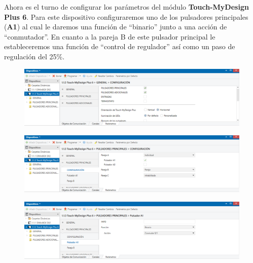 \documentclass[10pt]{article}
\begin{document}
Ahora es el turno de configurar los parámetros del módulo \textbf{Touch-MyDesign Plus 6}. Para este dispositivo configuraremos uno de los pulsadores principales (\textbf{A1}) al cual le daremos una función de ``binario'' junto a una acción de ``conmutador''. En cuanto a la pareja B de este pulsador principal le estableceremos una función de ``control de regulador'' así como un paso de regulación del 25\%. \\

\begin{figure}[H]
	\begin{center}
	 		\includegraphics[width = 1.00\textwidth]{Imagenes/img6}
	\end{center} 
\end{figure}

\begin{figure}[H]
	\begin{center}
	 		\includegraphics[width = 1.00\textwidth]{Imagenes/img7}
	\end{center} 
\end{figure}

\begin{figure}[H]
	\begin{center}
	 		\includegraphics[width = 1.00\textwidth]{Imagenes/img8}
	\end{center} 
\end{figure}
\end{document}
